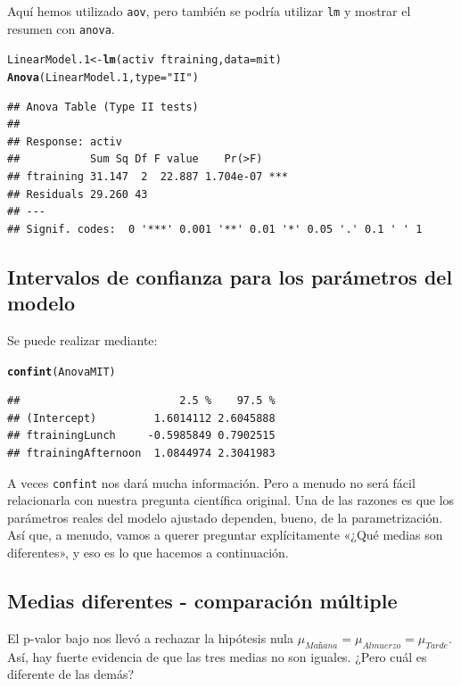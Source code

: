 \documentclass{config/apuntes}\usepackage[]{graphicx}\usepackage[]{xcolor}
\makeatletter
\newcommand{\hlsng}[1]{\textcolor[rgb]{0.192,0.494,0.8}{#1}}%
\newcommand{\hlopt}[1]{\textcolor[rgb]{0,0,0}{#1}}%
\newcommand{\hldef}[1]{\textcolor[rgb]{0.345,0.345,0.345}{#1}}%
\newcommand{\hlkwb}[1]{\textcolor[rgb]{0.69,0.353,0.396}{#1}}%
\newcommand{\hlkwc}[1]{\textcolor[rgb]{0.333,0.667,0.333}{#1}}%
\newcommand{\hlkwd}[1]{\textcolor[rgb]{0.737,0.353,0.396}{\textbf{#1}}}%
\newenvironment{kframe}{%
 \def\at@end@of@kframe{}%
 \ifinner\ifhmode%
  \def\at@end@of@kframe{\end{minipage}}%
  \begin{minipage}{\columnwidth}%
 \fi\fi%
 \def\FrameCommand##1{\hskip\@totalleftmargin \hskip-\fboxsep
 \colorbox{shadecolor}{##1}\hskip-\fboxsep
     \hskip-\linewidth \hskip-\@totalleftmargin \hskip\columnwidth}%
 \MakeFramed {\advance\hsize-\width
   \@totalleftmargin\z@ \linewidth\hsize
   \@setminipage}}%
 {\par\unskip\endMakeFramed%
 \at@end@of@kframe}
\newenvironment{knitrout}{}{} %
\makeatother
\begin{document}
Aquí hemos utilizado \texttt{aov}, pero también se podría utilizar \texttt{lm} y mostrar el resumen con \texttt{anova}.

\begin{knitrout}
\color{fgcolor}\begin{kframe}
\begin{alltt}
\hldef{LinearModel.1} \hlkwb{<-} \hlkwd{lm}\hldef{(activ} \hlopt{~} \hldef{ftraining,} \hlkwc{data} \hldef{= mit)}
\hlkwd{Anova}\hldef{(LinearModel.1,} \hlkwc{type}\hldef{=}\hlsng{"II"}\hldef{)}
\end{alltt}
\begin{verbatim}
## Anova Table (Type II tests)
## 
## Response: activ
##           Sum Sq Df F value    Pr(>F)    
## ftraining 31.147  2  22.887 1.704e-07 ***
## Residuals 29.260 43                      
## ---
## Signif. codes:  0 '***' 0.001 '**' 0.01 '*' 0.05 '.' 0.1 ' ' 1
\end{verbatim}
\end{kframe}
\end{knitrout}

\subsection{Intervalos de confianza para los parámetros del modelo}
Se puede realizar mediante:
\begin{knitrout}
\color{fgcolor}\begin{kframe}
\begin{alltt}
\hlkwd{confint}\hldef{(AnovaMIT)}
\end{alltt}
\begin{verbatim}
##                         2.5 %    97.5 %
## (Intercept)         1.6014112 2.6045888
## ftrainingLunch     -0.5985849 0.7902515
## ftrainingAfternoon  1.0844974 2.3041983
\end{verbatim}
\end{kframe}
\end{knitrout}

A veces \texttt{confint} nos dará mucha información. Pero a menudo no será fácil relacionarla con nuestra pregunta científica original. Una de las razones es que los parámetros reales del modelo ajustado dependen, bueno, de la parametrización. Así que, a menudo, vamos a querer preguntar explícitamente «¿Qué medias son diferentes», y eso es lo que hacemos a continuación.

\subsection{Medias diferentes - comparación múltiple}
El p-valor bajo nos llevó a rechazar la hipótesis nula $\mu_{Mañana} = \mu_{Almuerzo} = \mu_{Tarde}$. Así, hay fuerte evidencia de que las tres medias no son iguales. ¿Pero cuál es diferente de las demás?
\end{document}
